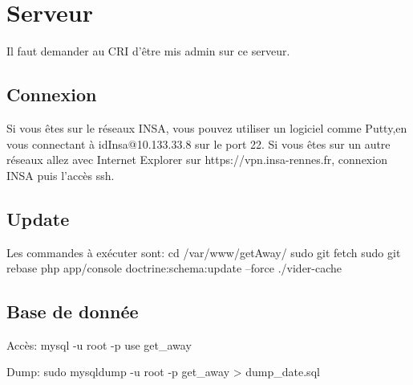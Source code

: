 \chapter{Serveur}
Il faut demander au CRI d'être mis admin sur ce serveur.
\section{Connexion}
Si vous êtes sur le réseaux INSA, vous pouvez utiliser un logiciel comme Putty,en vous connectant à idInsa@10.133.33.8 sur le port 22.
Si vous êtes sur un autre réseaux allez avec Internet Explorer sur https://vpn.insa-rennes.fr, connexion INSA puis l'accès ssh.

\section{Update}
Les commandes à exécuter sont:
cd /var/www/getAway/
sudo git fetch
sudo git rebase
php app/console doctrine:schema:update --force
./vider-cache

\section{Base de donnée}
Accès:
mysql -u root -p
use get_away


Dump:
sudo mysqldump -u root -p get_away > dump_date.sql

